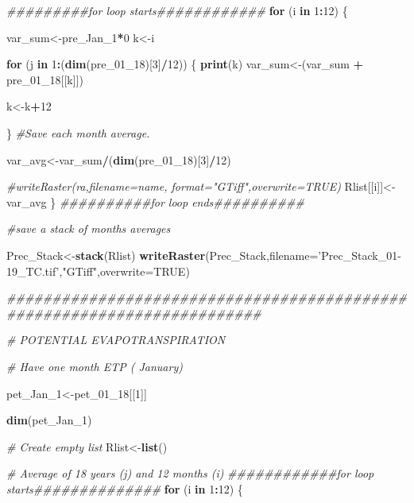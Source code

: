\documentclass[
  10pt,
  b5paper,
]{book}
\newenvironment{Shaded}{\begin{snugshade}}{\end{snugshade}}
\newcommand{\CommentTok}[1]{\textcolor[rgb]{0.56,0.35,0.01}{\textit{#1}}}
\newcommand{\ControlFlowTok}[1]{\textcolor[rgb]{0.13,0.29,0.53}{\textbf{#1}}}
\newcommand{\DataTypeTok}[1]{\textcolor[rgb]{0.13,0.29,0.53}{#1}}
\newcommand{\DecValTok}[1]{\textcolor[rgb]{0.00,0.00,0.81}{#1}}
\newcommand{\KeywordTok}[1]{\textcolor[rgb]{0.13,0.29,0.53}{\textbf{#1}}}
\newcommand{\NormalTok}[1]{#1}
\newcommand{\OperatorTok}[1]{\textcolor[rgb]{0.81,0.36,0.00}{\textbf{#1}}}
\newcommand{\OtherTok}[1]{\textcolor[rgb]{0.56,0.35,0.01}{#1}}
\newcommand{\StringTok}[1]{\textcolor[rgb]{0.31,0.60,0.02}{#1}}
\begin{document}
\begin{Shaded}
\begin{Highlighting}[]
\CommentTok{#########for loop starts############}
\ControlFlowTok{for}\NormalTok{ (i }\ControlFlowTok{in} \DecValTok{1}\OperatorTok{:}\DecValTok{12}\NormalTok{) \{ }

\NormalTok{var_sum<-pre_Jan_}\DecValTok{1}\OperatorTok{*}\DecValTok{0}
\NormalTok{k<-i}

\ControlFlowTok{for}\NormalTok{ (j }\ControlFlowTok{in} \DecValTok{1}\OperatorTok{:}\NormalTok{(}\KeywordTok{dim}\NormalTok{(pre_}\DecValTok{01}\NormalTok{_}\DecValTok{18}\NormalTok{)[}\DecValTok{3}\NormalTok{]}\OperatorTok{/}\DecValTok{12}\NormalTok{)) \{}
\KeywordTok{print}\NormalTok{(k)}
\NormalTok{var_sum<-(var_sum }\OperatorTok{+}\StringTok{ }\NormalTok{pre_}\DecValTok{01}\NormalTok{_}\DecValTok{18}\NormalTok{[[k]])}

\NormalTok{k<-k}\OperatorTok{+}\DecValTok{12}

\NormalTok{\}}
\CommentTok{#Save each month average. }

\NormalTok{var_avg<-var_sum}\OperatorTok{/}\NormalTok{(}\KeywordTok{dim}\NormalTok{(pre_}\DecValTok{01}\NormalTok{_}\DecValTok{18}\NormalTok{)[}\DecValTok{3}\NormalTok{]}\OperatorTok{/}\DecValTok{12}\NormalTok{)}

\CommentTok{#writeRaster(ra,filename=name, format="GTiff",overwrite=TRUE)}
\NormalTok{Rlist[[i]]<-var_avg}
\NormalTok{\}}
\CommentTok{##########for loop ends##########}

\CommentTok{#save a stack of months averages}

\NormalTok{Prec_Stack<-}\KeywordTok{stack}\NormalTok{(Rlist)}
\KeywordTok{writeRaster}\NormalTok{(Prec_Stack,}\DataTypeTok{filename=}\StringTok{'Prec_Stack_01-19_TC.tif'}\NormalTok{,}\StringTok{"GTiff"}\NormalTok{,}\DataTypeTok{overwrite=}\OtherTok{TRUE}\NormalTok{)}


\CommentTok{########################################################################}

\CommentTok{# POTENTIAL EVAPOTRANSPIRATION }

\CommentTok{# Have one month ETP ( January)}

\NormalTok{pet_Jan_}\DecValTok{1}\NormalTok{<-pet_}\DecValTok{01}\NormalTok{_}\DecValTok{18}\NormalTok{[[}\DecValTok{1}\NormalTok{]]}

\KeywordTok{dim}\NormalTok{(pet_Jan_}\DecValTok{1}\NormalTok{)}

\CommentTok{# Create empty list}
\NormalTok{Rlist<-}\KeywordTok{list}\NormalTok{()}

\CommentTok{# Average of 18 years (j)  and 12 months (i) }
\CommentTok{############for loop starts##############}
\ControlFlowTok{for}\NormalTok{ (i }\ControlFlowTok{in} \DecValTok{1}\OperatorTok{:}\DecValTok{12}\NormalTok{) \{ }


\end{Highlighting}
\end{Shaded}
\end{document}
